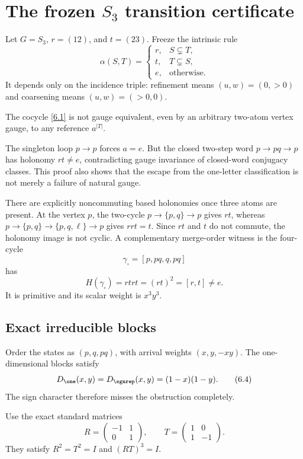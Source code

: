\section{The frozen \texorpdfstring{$S_3$}{S3} transition certificate}
\label{sec:s3}

Let $G=S_3$, $r=(12)$, and $t=(23)$.  Freeze the intrinsic rule
\[
\alpha(S,T)=
\begin{cases}
r,&S\subsetneq T,\\
t,&T\subsetneq S,\\
e,&\text{otherwise}.
\end{cases}
\tag{6.1}\label{6.1}
\]
It depends only on the incidence triple: refinement means $(u,w)=(0,>0)$
and coarsening means $(u,w)=(>0,0)$.

\begin{proposition}
\label{prop:not-clock}
The cocycle \eqref{6.1} is not gauge equivalent, even by an arbitrary
two-atom vertex gauge, to any reference $a^{|T|}$.
\end{proposition}

The singleton loop $p\to p$ forces $a=e$.  But the closed two-step word
$p\to pq\to p$ has holonomy $rt\ne e$, contradicting gauge invariance of
closed-word conjugacy classes.  This proof also shows that the escape from
the one-letter classification is not merely a failure of natural gauge.

There are explicitly noncommuting based holonomies once three atoms are
present.  At the vertex $p$, the two-cycle
$p\to\{p,q\}\to p$ gives $rt$, whereas
$p\to\{p,q\}\to\{p,q,\ell\}\to p$ gives $rrt=t$.  Since $rt$ and $t$
do not commute, the holonomy image is not cyclic.  A complementary
merge-order witness is the four-cycle
\[
 \gamma_\square=[p,pq,q,pq]
\tag{6.2}\label{6.2}
\]
has
\[
 H(\gamma_\square)=rtrt=(rt)^2=[r,t]\ne e.
\tag{6.3}\label{6.3}
\]
It is primitive and its scalar weight is $x^3y^3$.

\subsection{Exact irreducible blocks}

Order the states as $(p,q,pq)$, with arrival weights $(x,y,-xy)$.  The
one-dimensional blocks satisfy
\[
 D_{\one}(x,y)=D_{\sgnrep}(x,y)=(1-x)(1-y).
 \tag{6.4}\label{6.4}
\]
The sign character therefore misses the obstruction completely.

Use the exact standard matrices
\[
 R=\begin{pmatrix}-1&1\\0&1\end{pmatrix},\qquad
 T=\begin{pmatrix}1&0\\1&-1\end{pmatrix}.
 \tag{6.5}\label{6.5}
\]
They satisfy $R^2=T^2=I$ and $(RT)^3=I$.

